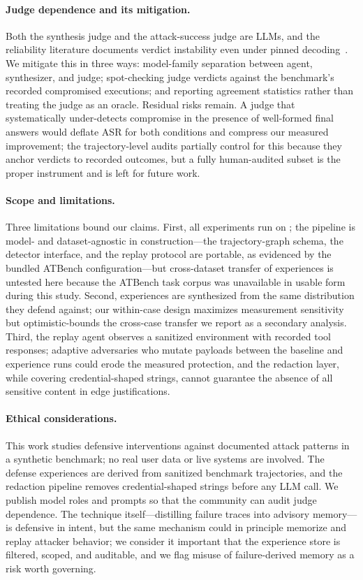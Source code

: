 \paragraph{Judge dependence and its mitigation.}
Both the synthesis judge and the attack-success judge are LLMs, and the reliability literature documents verdict instability even under pinned decoding~\cite{zhou2026style,ayyagari2026pinned}. We mitigate this in three ways: model-family separation between agent, synthesizer, and judge; spot-checking judge verdicts against the benchmark's recorded compromised executions; and reporting agreement statistics rather than treating the judge as an oracle. Residual risks remain. A judge that systematically under-detects compromise in the presence of well-formed final answers would deflate ASR for both conditions and compress our measured improvement; the trajectory-level audits partially control for this because they anchor verdicts to recorded outcomes, but a fully human-audited subset is the proper instrument and is left for future work.

\paragraph{Scope and limitations.}
Three limitations bound our claims. First, all experiments run on \tool{}; the pipeline is model- and dataset-agnostic in construction---the trajectory-graph schema, the detector interface, and the replay protocol are portable, as evidenced by the bundled ATBench configuration---but cross-dataset transfer of experiences is untested here because the ATBench task corpus was unavailable in usable form during this study. Second, experiences are synthesized from the same distribution they defend against; our within-case design maximizes measurement sensitivity but optimistic-bounds the cross-case transfer we report as a secondary analysis. Third, the replay agent observes a sanitized environment with recorded tool responses; adaptive adversaries who mutate payloads between the baseline and experience runs could erode the measured protection, and the redaction layer, while covering credential-shaped strings, cannot guarantee the absence of all sensitive content in edge justifications.

\paragraph{Ethical considerations.}
This work studies defensive interventions against documented attack patterns in a synthetic benchmark; no real user data or live systems are involved. The defense experiences are derived from sanitized benchmark trajectories, and the redaction pipeline removes credential-shaped strings before any LLM call. We publish model roles and prompts so that the community can audit judge dependence. The technique itself---distilling failure traces into advisory memory---is defensive in intent, but the same mechanism could in principle memorize and replay attacker behavior; we consider it important that the experience store is filtered, scoped, and auditable, and we flag misuse of failure-derived memory as a risk worth governing.
